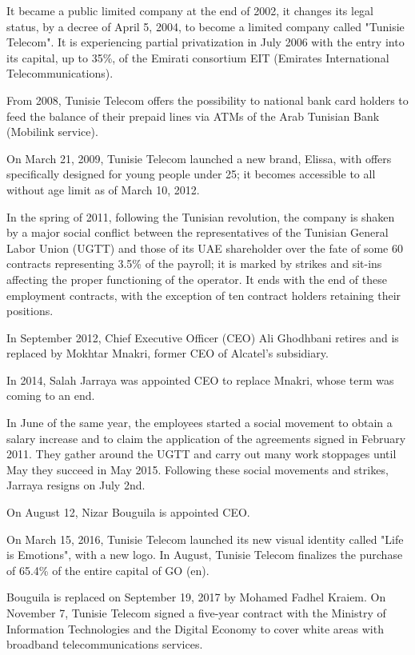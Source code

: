 It became a public limited company at the end of 2002, it changes its legal status, by a decree of April 5, 2004, to become a limited company called "Tunisie Telecom". It is experiencing partial privatization in July 2006 with the entry into its capital, up to 35\%, of the Emirati consortium EIT (Emirates International Telecommunications).

From 2008, Tunisie Telecom offers the possibility to national bank card holders to feed the balance of their prepaid lines via ATMs of the Arab Tunisian Bank (Mobilink service).

On March 21, 2009, Tunisie Telecom launched a new brand, Elissa, with offers specifically designed for young people under 25; it becomes accessible to all without age limit as of March 10, 2012.

In the spring of 2011, following the Tunisian revolution, the company is shaken by a major social conflict between the representatives of the Tunisian General Labor Union (UGTT) and those of its UAE shareholder over the fate of some 60 contracts representing 3.5\% of the payroll; it is marked by strikes and sit-ins affecting the proper functioning of the operator. It ends with the end of these employment contracts, with the exception of ten contract holders retaining their positions.

In September 2012, Chief Executive Officer (CEO) Ali Ghodhbani retires and is replaced by Mokhtar Mnakri, former CEO of Alcatel's subsidiary.

In 2014, Salah Jarraya was appointed CEO to replace Mnakri, whose term was coming to an end.

In June of the same year, the employees started a social movement to obtain a salary increase and to claim the application of the agreements signed in February 2011. They gather around the UGTT and carry out many work stoppages until May they succeed in May 2015. Following these social movements and strikes, Jarraya resigns on July 2nd.

On August 12, Nizar Bouguila is appointed CEO.

On March 15, 2016, Tunisie Telecom launched its new visual identity called "Life is Emotions", with a new logo. In August, Tunisie Telecom finalizes the purchase of 65.4\% of the entire capital of GO (en).

Bouguila is replaced on September 19, 2017 by Mohamed Fadhel Kraiem. On November 7, Tunisie Telecom signed a five-year contract with the Ministry of Information Technologies and the Digital Economy to cover white areas with broadband telecommunications services.

